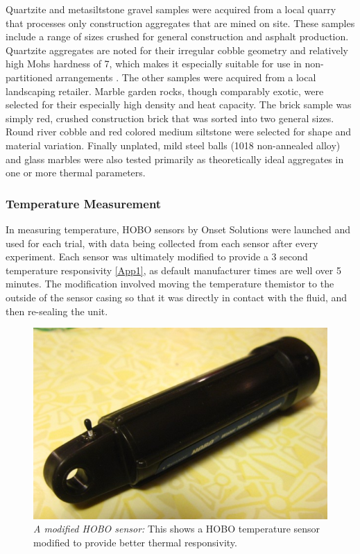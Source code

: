 Quartzite and metasiltstone gravel samples were acquired from a local quarry that processes only construction aggregates that are mined on site. These samples include a range of sizes crushed for general construction and asphalt production. Quartzite aggregates are noted for their irregular cobble geometry and relatively high Mohs hardness of 7, which makes it especially suitable for use in non-partitioned arrangements \cite{ballast}. The other samples were acquired from a local landscaping retailer. Marble garden rocks, though comparably exotic, were selected for their especially high density and heat capacity. The brick sample was simply red, crushed construction brick that was sorted into two general sizes. Round river cobble and red colored medium siltstone were selected for shape and material variation. Finally unplated, mild steel balls (1018 non-annealed alloy) and glass marbles were also tested primarily as theoretically ideal aggregates in one or more thermal parameters.

\subsubsection*{Temperature Measurement}
In measuring temperature, HOBO sensors by Onset Solutions were launched and used for each trial, with data being collected from each sensor after every experiment. Each sensor was ultimately modified to provide a 3 second temperature responsivity \ref{App1}, as default manufacturer times are well over 5 minutes. The modification involved moving the temperature themistor to the outside of the sensor casing so that it was directly in contact with the fluid, and then re-sealing the unit. 

\begin{center}
\begin{figure}
 \label{modSens}
 \centering\includegraphics[scale=0.6]{modSensor.jpg}
 \caption{\emph{A modified HOBO sensor:} This shows a HOBO temperature sensor modified to provide better thermal responsivity.}
\end{figure}
\end{center}

